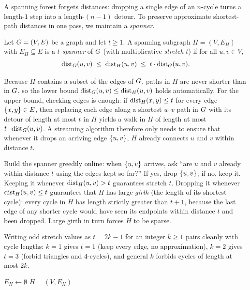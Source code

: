 A spanning forest forgets distances: dropping a single edge of an $n$-cycle
turns a length-$1$ step into a length-$(n-1)$ detour. To preserve approximate
shortest-path distances in one pass, we maintain a \emph{spanner}.

\begin{definition}[Spanner]\label{ch40:def-spanner}
Let $G=(V,E)$ be a graph and let $t \ge 1$. A spanning subgraph
$H=(V,E_H)$ with $E_H \subseteq E$ is a \emph{$t$-spanner} of $G$ (with
multiplicative \emph{stretch} $t$) if for all $u,v\in V$,
\[
\operatorname{dist}_G(u,v) \;\le\; \operatorname{dist}_H(u,v) \;\le\; t\cdot \operatorname{dist}_G(u,v).
\]
\end{definition}

Because $H$ contains a subset of the edges of $G$, paths in $H$ are never
shorter than in $G$, so the lower bound $\operatorname{dist}_G(u,v) \le \operatorname{dist}_H(u,v)$
holds automatically. For the upper bound, checking edges is enough: if
$\operatorname{dist}_H(x,y) \le t$ for every edge $\{x,y\}\in E$, then replacing each edge
along a shortest $u$--$v$ path in $G$ with its detour of length at most $t$
in $H$ yields a walk in $H$ of length at most $t\cdot \operatorname{dist}_G(u,v)$. A
streaming algorithm therefore only needs to ensure that whenever it drops an
arriving edge $\{u,v\}$, $H$ already connects $u$ and $v$ within distance $t$.

\begin{intuitionbox}
Build the spanner greedily online: when $\{u,v\}$ arrives, ask ``are $u$ and
$v$ already within distance $t$ using the edges kept so far?'' If yes, drop
$\{u,v\}$; if no, keep it. Keeping it whenever $\operatorname{dist}_H(u,v)>t$ guarantees
stretch $t$. Dropping it whenever $\operatorname{dist}_H(u,v)\le t$ guarantees that $H$ has
large \emph{girth} (the length of its shortest cycle): every cycle in $H$ has
length strictly greater than $t+1$, because the last edge of any shorter cycle
would have seen its endpoints within distance $t$ and been dropped. Large girth
in turn forces $H$ to be sparse.
\end{intuitionbox}

Writing odd stretch values as $t = 2k-1$ for an integer $k \ge 1$ pairs cleanly
with cycle lengths: $k=1$ gives $t=1$ (keep every edge, no approximation),
$k=2$ gives $t=3$ (forbid triangles and $4$-cycles), and general $k$ forbids
cycles of length at most $2k$.

\begin{algorithm}[H]
\caption{\textsc{StreamingGreedySpanner}$(t)$, for odd $t=2k-1$}
\label{ch40:alg-spanner}
\DontPrintSemicolon
{}
$E_H \gets \emptyset$\;
\Return $H=(V,E_H)$\;
\end{algorithm}

